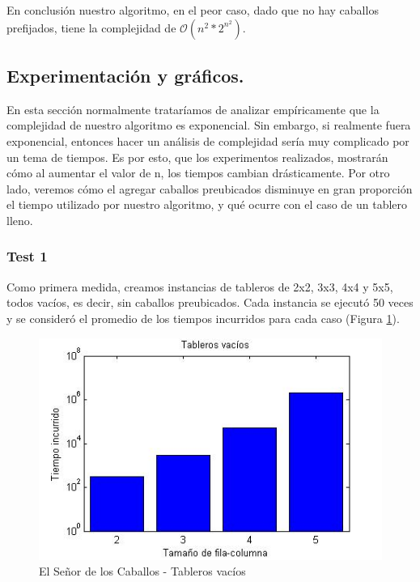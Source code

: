 En conclusión nuestro algoritmo, en el peor caso, dado que no hay caballos prefijados, tiene la complejidad de $\mathcal{O}(n^2*2^{n^2})$.

\vspace*{0.6cm}

\subsection{Experimentación y gráficos.}

\vspace*{0.3cm}

En esta sección normalmente trataríamos de analizar empíricamente que la complejidad de nuestro algoritmo es exponencial. Sin embargo, si realmente fuera exponencial, entonces hacer un análisis de complejidad sería muy complicado por un tema de tiempos. Es por esto, que los experimentos realizados, mostrarán cómo al aumentar el valor de n, los tiempos cambian drásticamente. Por otro lado, veremos cómo el agregar caballos preubicados disminuye en gran proporción el tiempo utilizado por nuestro algoritmo, y qué ocurre con el caso de un tablero lleno.

\subsubsection{Test 1}

\vspace*{0.3cm}

Como primera medida, creamos instancias de tableros de 2x2, 3x3, 4x4 y 5x5, todos vacíos, es decir, sin caballos preubicados.  Cada instancia se ejecutó 50 veces y se consideró el promedio de los tiempos incurridos para cada caso (Figura \ref{fig:3-vacios}).

\begin{figure}[htb]
	\begin{center}
    		\includegraphics[scale=0.5]{imagenes/3-vacios.jpg}
	\end{center}
	\caption{El Señor de los Caballos - Tableros vacíos}\label{fig:3-vacios}
\end{figure}

